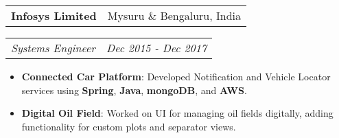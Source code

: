 \documentclass[letterpaper,11pt]{article}
\makeatletter
\newcommand{\resumeItem}[2]{
  \item\small{
    \textbf{#1}{: #2 \vspace{-2pt}}
  }
}
\newcommand{\resumeSubheading}[2]{
  \vspace{-1pt}\item
    \begin{tabular*}{0.97\textwidth}[t]{l@{\extracolsep{\fill}}r}
      \textbf{#1} & #2 \\
    \end{tabular*}
}
\newcommand{\resumeSubSubheading}[2]{
    \begin{tabular*}{0.97\textwidth}[t]{l@{\extracolsep{\fill}}r}
      \textit{\small#1} & \textit{\small #2} \\
    \end{tabular*}\vspace{-5pt}
}
\newcommand{\resumeItemListStart}{\begin{itemize}}
\newcommand{\resumeItemListEnd}{\end{itemize}\vspace{-5pt}}
\makeatother
\begin{document}
    \resumeSubheading
      {Infosys Limited}{Mysuru \& Bengaluru, India}
      \resumeSubSubheading
        {Systems Engineer}{Dec 2015 - Dec 2017}
        \resumeItemListStart
          \resumeItem{Connected Car Platform}
            {Developed Notification and Vehicle Locator services using \textbf{Spring}, \textbf{Java}, \textbf{mongoDB}, and \textbf{AWS}.}

          \resumeItem{Digital Oil Field}
            {Worked on UI for managing oil fields digitally, adding functionality for custom plots and separator views.}
        \resumeItemListEnd
\end{document}
